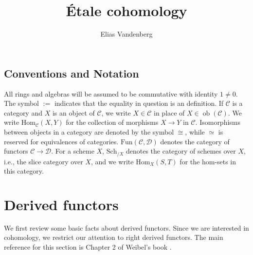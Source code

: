 \documentclass{article}
\title{\'Etale cohomology}
\author{Elias Vandenberg}
\def\~#1{\mathscr{#1}}
\numberwithin{equation}{section}
\numberwithin{figure}{section}
\newcommand{\Hom}{\mathrm{Hom}}
\newcommand{\ob}{\mathop{\mathrm{ob}}}
\newcommand{\Fun}{\mathrm{Fun}}
\newcommand{\Sch}{\mathrm{Sch}}
\theoremstyle{plain}
\theoremstyle{definition}
\theoremstyle{remark}
\begin{document}
\maketitle
  \tableofcontents

\subsection*{Conventions and Notation}
All rings and algebras will be assumed to be commutative with identity $1 \ne 0$. The symbol $:=$ indicates that the equality in question is an definition. If $\~C$ is a category and $X$ is an object of $\~C$, we write $X \in \~C$ in place of $X \in \ob(\~C)$. We write $\Hom_{\~C}(X,Y)$ for the collection of morphisms $X \to Y$ in $\~C$. Isomorphisms between objects in a category are denoted by the symbol $\cong$, while $\simeq$ is reserved for equivalences of categories. $\Fun(\~C, \~D)$ denotes the category of functors $\~C \to \~D$. For a scheme $X$, $\Sch_{\!/\!X}$ denotes the category of schemes over $X$, i.e., the slice category over $X$, and we write $\Hom_X(S,T)$ for the hom-sets in this category.
\section{Derived functors}

We first review some basic facts about derived functors. Since we are interested in cohomology, we restrict our attention to right derived functors. The main reference for this section is Chapter 2 of Weibel's book \cite{weibel}. 
\end{document}
